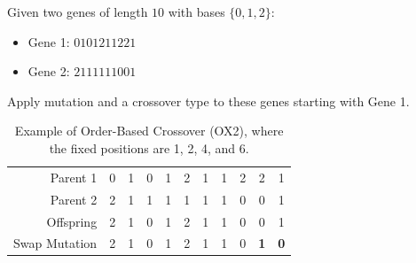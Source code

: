 \documentclass[12pt]{article}
\begin{document}
    \begin{ejercicio}
        Given two genes of length $10$ with bases $\{0, 1, 2\}$:
        \begin{itemize}
            \item Gene 1: $0101211221$
            \item Gene 2: $2111111001$
        \end{itemize}
        Apply mutation and a crossover type to these genes starting with Gene 1.
        \begin{table}[ht]
            \centering
            \begin{tabular}{r|cccccccccc}
                Parent 1 & 0 & 1 & 0 & 1 & 2 & 1 & 1 & 2 & 2 & 1 \\
                Parent 2 & 2 & 1 & 1 & 1 & 1 & 1 & 1 & 0 & 0 & 1 \\ \hline
                Offspring & 2 & 1 & 0 & 1 & 2 & 1 & 1 & 0 & 0 & 1 \\
                Swap Mutation & 2 & 1 & 0 & 1 & 2 & 1 & 1 & 0 & \textbf{1} & \textbf{0} \\
            \end{tabular}
            \caption{\centering Example of Order-Based Crossover (OX2), where the fixed positions are 1, 2, 4, and 6.}
            \label{tab:ox2_example}
        \end{table}
    \end{ejercicio}
\end{document}
